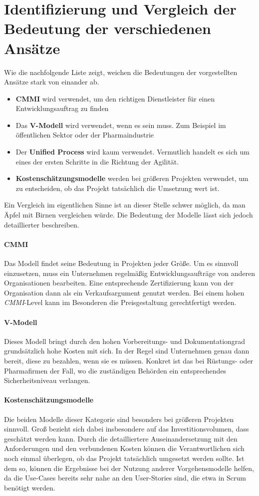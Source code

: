 \section{Identifizierung und Vergleich der Bedeutung der verschiedenen Ansätze}
Wie die nachfolgende Liste zeigt, weichen die Bedeutungen der vorgestellten Ansätze stark von einander ab.

\begin{itemize}
    \item \textbf{CMMI} wird verwendet, um den richtigen Dienstleister für einen Entwicklungsauftrag zu finden
    \item Das \textbf{V-Modell} wird verwendet, wenn es sein muss. Zum Beispiel im öffentlichen Sektor oder der Pharmaindustrie
    \item Der \textbf{Unified Process} wird kaum verwendet. Vermutlich handelt es sich um eines der ersten Schritte in die Richtung der Agilität.
    \item \textbf{Kostenschätzungsmodelle} werden bei größeren Projekten verwendet, um zu entscheiden, ob das Projekt tatsächlich die Umsetzung wert ist.
\end{itemize}

Ein Vergleich im eigentlichen Sinne ist an dieser Stelle schwer möglich, da man Äpfel mit Birnen vergleichen würde. Die Bedeutung der Modelle lässt sich jedoch detaillierter beschreiben.

\paragraph{CMMI} Das Modell findet seine Bedeutung in Projekten jeder Größe. Um es sinnvoll einzusetzen, muss ein Unternehmen regelmäßig Entwicklungsaufträge von anderen Organisationen bearbeiten. Eine entsprechende Zertifizierung kann von der Organisation dann als ein Verkaufsargument genutzt werden. Bei einem hohen \textit{CMMI}-Level kann im Besonderen die Preisgestaltung gerechtfertigt werden.

\paragraph{V-Modell} Dieses Modell bringt durch den hohen Vorbereitungs- und Dokumentationgrad grundsätzlich hohe Kosten mit sich. In der Regel sind Unternehmen genau dann bereit, diese zu bezahlen, wenn sie es müssen. Konkret ist das bei Rüstungs- oder Pharmafirmen der Fall, wo die zuständigen Behörden ein entsprechendes Sicherheitsniveau verlangen.

\paragraph{Kostenschätzungsmodelle} Die beiden Modelle dieser Kategorie sind besonders bei größeren Projekten sinnvoll. Groß bezieht sich dabei insbesondere auf das Investitionsvolumen, dass geschätzt werden kann. Durch die detailliertere Auseinandersetzung mit den Anforderungen und den verbundenen Kosten können die Verantwortlichen sich noch einmal überlegen, ob das Projekt tatsächlich umgesetzt werden sollte. Ist dem so, können die Ergebnisse bei der Nutzung anderer Vorgehensmodelle helfen, da die Use-Cases bereits sehr nahe an den User-Stories sind, die etwa in Scrum benötigt werden.